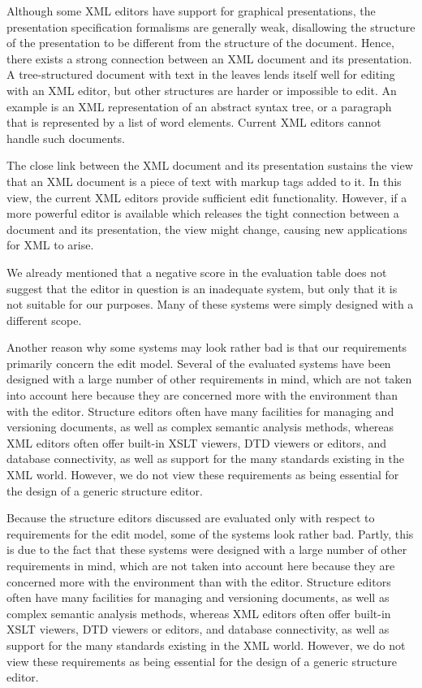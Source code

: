 \documentclass{entcs}
\begin{document}
Although some XML editors have support for graphical presentations, the presentation specification formalisms are generally weak, disallowing the structure of the presentation to be different from the structure of the document. Hence, there exists a strong connection between an XML document and its presentation. A tree-structured document with text in the leaves lends itself well for editing with an XML editor, but other structures are harder or impossible to edit. An example is an XML representation of an abstract syntax tree, or a paragraph that is represented by a list of word elements. Current XML editors cannot handle such documents.

The close link between the XML document and its presentation sustains the view that an XML document is a piece of text with markup tags added to it. In this view, the current XML editors provide sufficient edit functionality. However, if a more powerful editor is available which releases the tight connection between a document and its presentation, the view might change, causing new applications for XML to arise.


\bigskip
{}


We already mentioned that a negative score in the evaluation table does not suggest that the editor in question is an inadequate system, but only that it is not suitable for our purposes. Many of these systems were simply designed with a different scope.

Another reason why some systems may look rather bad is that our requirements primarily concern the edit model. Several of the evaluated systems have been designed with a large number of other requirements in mind, which are not taken into account here because they are concerned more with the environment than with the editor. Structure editors often have many facilities for managing and versioning documents, as well as complex semantic analysis methods, whereas XML editors often offer built-in XSLT viewers, DTD viewers or editors, and database connectivity, as well as support for the many standards existing in the XML world. However, we do not view these requirements as being essential for the design of a generic structure editor.


\bc
Because the structure editors discussed are evaluated only with respect to requirements for the edit model, some of the systems look rather bad. Partly, this is due to the fact that these systems were designed with a large number of other requirements in mind, which are not taken into account here because they are concerned more with the environment than with the editor. Structure editors often have many facilities for managing and versioning documents, as well as complex semantic analysis methods, whereas XML editors often offer built-in XSLT viewers, DTD viewers or editors, and database connectivity, as well as support for the many standards existing in the XML world. However, we do not view these requirements as being essential for the design of a generic structure editor.
\ec
\end{document}
